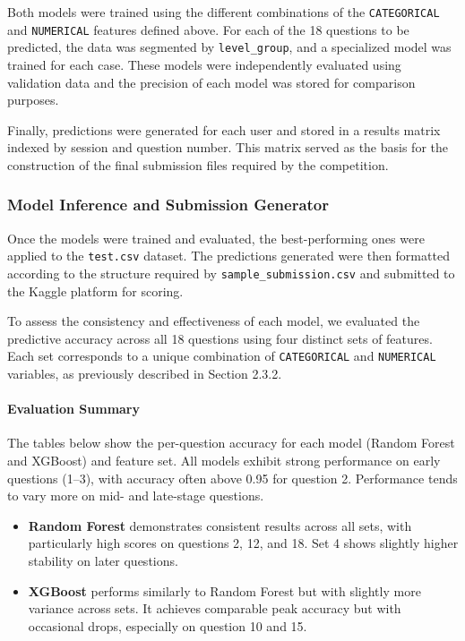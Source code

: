 \documentclass[12pt]{article}
\begin{document}
Both models were trained using the different combinations of the \texttt{CATEGORICAL} and \texttt{NUMERICAL} features defined above. For each of the 18 questions to be predicted, the data was segmented by \texttt{level\_group}, and a specialized model was trained for each case. These models were independently evaluated using validation data and the precision of each model was stored for comparison purposes.

Finally, predictions were generated for each user and stored in a results matrix indexed by session and question number. This matrix served as the basis for the construction of the final submission files required by the competition.

	
	\subsubsection{Model Inference and Submission Generator}

Once the models were trained and evaluated, the best-performing ones were applied to the \texttt{test.csv} dataset. The predictions generated were then formatted according to the structure required by \texttt{sample\_submission.csv} and submitted to the Kaggle platform for scoring.

To assess the consistency and effectiveness of each model, we evaluated the predictive accuracy across all 18 questions using four distinct sets of features. Each set corresponds to a unique combination of \texttt{CATEGORICAL} and \texttt{NUMERICAL} variables, as previously described in Section 2.3.2.

\vspace{0.5em}
\paragraph{Evaluation Summary}

The tables below show the per-question accuracy for each model (Random Forest and XGBoost) and feature set. All models exhibit strong performance on early questions (1–3), with accuracy often above 0.95 for question 2. Performance tends to vary more on mid- and late-stage questions.

\vspace{0.5em}
\begin{itemize}
    \item \textbf{Random Forest} demonstrates consistent results across all sets, with particularly high scores on questions 2, 12, and 18. Set 4 shows slightly higher stability on later questions.
    \item \textbf{XGBoost} performs similarly to Random Forest but with slightly more variance across sets. It achieves comparable peak accuracy but with occasional drops, especially on question 10 and 15.
\end{itemize}
\end{document}
